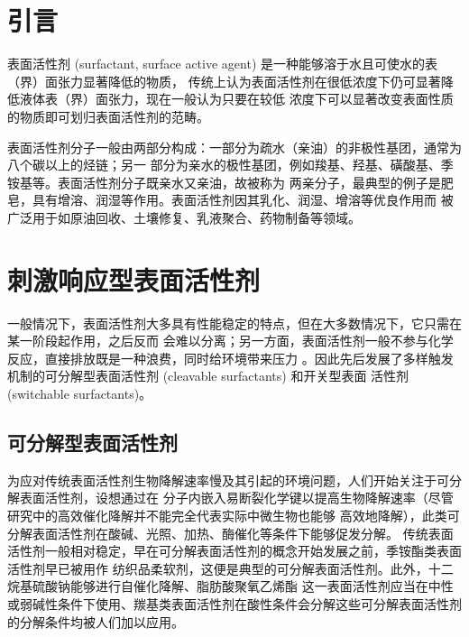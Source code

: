 \documentclass[bachelor,winfonts,replaceperiod]{jnuthesis}
\begin{document}
    \section{引言}
    表面活性剂 (surfactant, surface active agent) 是一种能够溶于水且可使水的表（界）面张力显著降低的物质，
    传统上认为表面活性剂在很低浓度下仍可显著降低液体表（界）面张力，现在一般认为只要在较低
    浓度下可以显著改变表面性质的物质即可划归表面活性剂的范畴。
    
    表面活性剂分子一般由两部分构成：一部分为疏水（亲油）的非极性基团，通常为八个碳以上的烃链；另一
    部分为亲水的极性基团，例如羧基、羟基、磺酸基、季铵基等。表面活性剂分子既亲水又亲油，故被称为
    两亲分子，最典型的例子是肥皂，具有增溶、润湿等作用。表面活性剂因其乳化、润湿、增溶等优良作用而
    被广泛用于如原油回收、土壤修复、乳液聚合、药物制备等领域\cite{秦勇2009}。
    
    \section{刺激响应型表面活性剂}
    一般情况下，表面活性剂大多具有性能稳定的特点，但在大多数情况下，它只需在某一阶段起作用，之后反而
    会难以分离；另一方面，表面活性剂一般不参与化学反应，直接排放既是一种浪费，同时给环境带来压力
    \cite{秦勇2009}。因此先后发展了多样触发机制的可分解型表面活性剂 (cleavable surfactants) 和开关型表面
    活性剂 (switchable surfactants)。
    
    \subsection{可分解型表面活性剂}
    为应对传统表面活性剂生物降解速率慢及其引起的环境问题，人们开始关注于可分解表面活性剂，设想通过在
    分子内嵌入易断裂化学键以提高生物降解速率（尽管研究中的高效催化降解并不能完全代表实际中微生物也能够
    高效地降解）\cite{tehrani2007}，此类可分解表面活性剂在酸碱、光照、加热、酶催化等条件下能够促发分解\cite{hellberg2000}。
    传统表面活性剂一般相对稳定，早在可分解表面活性剂的概念开始发展之前，季铵酯类表面活性剂早已被用作
    纺织品柔软剂，这便是典型的可分解表面活性剂。此外，十二烷基硫酸钠能够进行自催化降解、脂肪酸聚氧乙烯酯
    这一表面活性剂应当在中性或弱碱性条件下使用、羰基类表面活性剂在酸性条件会分解这些可分解表面活性剂
    的分解条件均被人们加以应用\cite{tehrani2007}。
    
\end{document}

